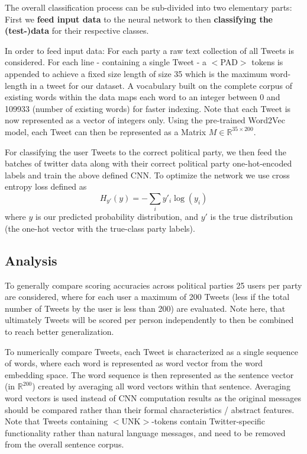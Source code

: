 \documentclass[10pt, oneside]{article}
\begin{document}
\begin{multicols}{2}
The overall classification process can be sub-divided into two elementary parts: First we \textbf{feed input data} to the neural network to then \textbf{classifying the (test-)data} for their respective classes.

In order to feed input data: For each party a raw text collection of all Tweets is considered. For each line - containing a single Tweet - a $<$PAD$>$ tokens is appended to achieve a fixed size length of size 35 which is the maximum word-length in a tweet for our dataset.  A vocabulary built on the complete corpus of existing words within the data maps each word to an integer between 0 and 109933 (number of existing words) for faster indexing.
Note that each Tweet is now represented as a vector of integers only. Using the pre-trained Word2Vec model, each Tweet can then be represented as a Matrix $M \in \mathbb{R}^{35 \times 200}$.

For classifying the user Tweets to the correct political party, we then feed the batches of twitter data along with their correct political party one-hot-encoded labels and train the above defined CNN. To optimize the network we use cross entropy loss defined as
\begin{equation*}
	H_{y'}(y) = - \sum_{i} y'_{i} \log (y_{i})
\end{equation*}
where $y$ is our predicted probability distribution, and $y'$ is the true distribution (the one-hot vector with the true-class party labels). 

\subsection{Analysis}\label{subsec:methodAnalysis}

To generally compare scoring accuracies across political parties 25 users per party are considered, where for each user a maximum of 200 Tweets (less if the total number of Tweets by the user is less than 200) are evaluated. Note here, that ultimately Tweets will be scored per person independently to then be combined to reach better generalization.

To numerically compare Tweets, each Tweet is characterized as a single sequence of words, where each word is represented as word vector from the word embedding space. The word sequence is then represented as the sentence vector (in $\mathbb{R}^{200}$) created by averaging all word vectors within that sentence.
Averaging word vectors is used instead of CNN computation results as the original messages should be compared rather than their formal characteristics / abstract features.
Note that Tweets containing $<$UNK$>$-tokens contain Twitter-specific functionality rather than natural language messages, and need to be removed from the overall sentence corpus.


\end{multicols}
\end{document}
